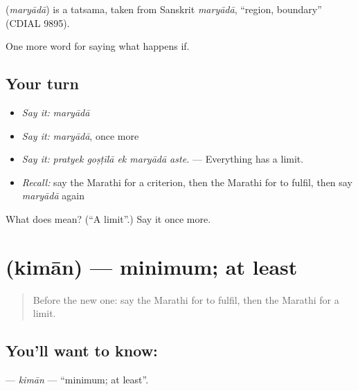 \begin{cousinweb}
\textbf{} (\emph{maryādā}) is a tatsama, taken from Sanskrit \emph{maryādā}, \textquotedblleft{}region, boundary\textquotedblright{} (CDIAL 9895).
\end{cousinweb}

\begin{grammarlens}[title={What you've built}]
One more word for saying what happens if.
\end{grammarlens}

\subsection*{Your turn}
\begin{itemize}
\raggedright
  \item \emph{Say it:} \emph{maryādā}
  \item \emph{Say it:} \emph{maryādā}, once more
  \item \emph{Say it:} \emph{pratyek goṣṭīlā ek maryādā aste.} — Everything has a limit.
  \item \emph{Recall:} say the Marathi for a criterion, then the Marathi for to fulfil, then say \emph{maryādā} again
\end{itemize}

\begin{tcolorbox}[breakable,colback=teal!4,colframe=teal!35!black,title={Before you move on}]
What does  mean? (\textquotedblleft{}A limit\textquotedblright{}.) Say it once more.
\end{tcolorbox}
\section[\texorpdfstring{\mr{किमान} (kimān)}{किमान (kimān)}]{ (kimān) — minimum; at least}

\label{lesson:MR-C379-kiman}



\begin{quote}
Before the new one: say the Marathi for to fulfil, then the Marathi for a limit.
\end{quote}

\subsection*{You'll want to know: }
\textbf{} — \emph{kimān} — \textquotedblleft{}minimum; at least\textquotedblright{}.


